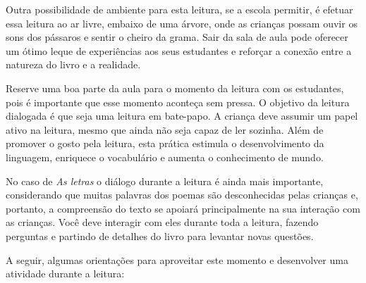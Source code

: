 \documentclass[11pt]{extarticle}
\begin{document}
Outra possibilidade de ambiente para esta leitura, se a escola permitir, 
é efetuar essa leitura ao ar livre, embaixo de uma árvore, onde as crianças 
possam ouvir os sons dos pássaros e sentir o cheiro da grama. Sair da sala 
de aula pode oferecer um ótimo leque de experiências aos seus estudantes e 
reforçar a conexão entre a natureza do livro e a realidade.  

Reserve uma boa parte da aula para o momento da leitura com os estudantes, 
pois é importante que esse momento aconteça sem pressa. O objetivo da 
leitura dialogada é que seja uma leitura em bate-papo. A criança deve 
assumir um papel ativo na leitura, mesmo que ainda não seja capaz de 
ler sozinha. Além de promover o gosto pela leitura, esta prática estimula 
o desenvolvimento da linguagem, enriquece o vocabulário e 
aumenta o conhecimento de mundo.

No caso de \textit{As letras} o diálogo durante a leitura é 
ainda mais importante, considerando que muitas palavras dos poemas são desconhecidas pelas crianças e, portanto, a compreensão do texto se apoiará principalmente na sua interação com as crianças. 
Você deve interagir com eles durante toda a 
leitura, fazendo perguntas e partindo de detalhes do livro para 
levantar novas questões. 

A seguir, algumas orientações para aproveitar este momento e desenvolver uma atividade durante a leitura: 
\end{document}
